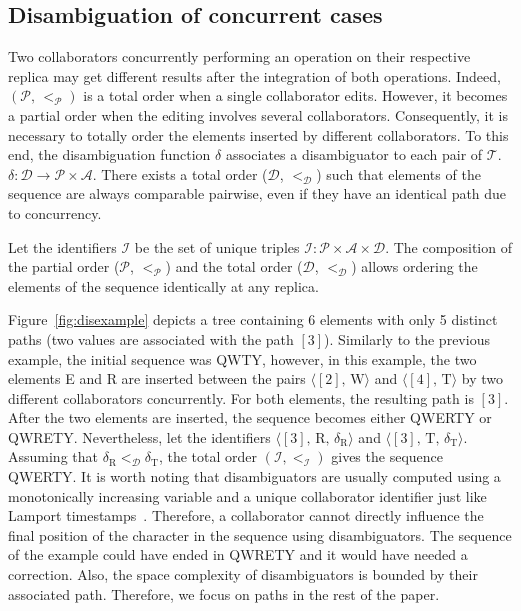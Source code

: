 \subsection{Disambiguation of concurrent cases}
\label{subsec:disambiguation}

Two collaborators concurrently performing an operation on their respective
replica may get different results after the integration of both
operations. Indeed, $(\mathcal{P},\,<_\mathcal{P})$ is a total order when a
single collaborator edits. However, it becomes a partial order when the editing
involves several collaborators. Consequently, it is necessary to totally order
the elements inserted by different collaborators. To this end, the
disambiguation function $\delta$ associates a disambiguator to each pair of
$\mathcal{T}$. $\delta: \mathcal{D} \rightarrow \mathcal{P}\times\mathcal{A}$.
There exists a total order ($\mathcal{D}$, $<_{\mathcal{D}}$) such that elements
of the sequence are always comparable pairwise, even if they have an identical
path due to concurrency. 

Let the identifiers $\mathcal{I}$ be the set of unique triples
$\mathcal{I}:\mathcal{P}\times \mathcal{A}\times \mathcal{D}$. The composition
of the partial order ($\mathcal{P}$, $<_{\mathcal{P}}$) and the total order
($\mathcal{D}$, $<_{\mathcal{D}}$) allows ordering the elements of the sequence
identically at any replica.

Figure~\ref{fig:disexample} depicts a tree containing 6 elements with only 5
distinct paths (two values are associated with the path $[3]$). Similarly to the
previous example, the initial sequence was QWTY, however, in this example, the
two elements E and R are inserted between the pairs
$\langle [2],\, \text{W}\rangle$ and $\langle [4],\, \text{T}\rangle$ by two
different collaborators concurrently. For both elements, the resulting path is
$[3]$. After the two elements are inserted, the sequence becomes either QWERTY
or QWRETY. Nevertheless, let the identifiers
$\langle [3],\, \text{R},\, \delta_\text{R}\rangle$ and
$\langle [3],\, \text{T},\, \delta_\text{T} \rangle$. Assuming that
$\delta_\text{R} <_\mathcal{D} \delta_\text{T}$, the total order
$(\mathcal{I}, <_\mathcal{I})$ gives the sequence QWERTY. It is worth noting
that disambiguators are usually computed using a monotonically increasing
variable and a unique collaborator identifier just like Lamport
timestamps~\cite{lamport1978time}. Therefore, a collaborator cannot directly
influence the final position of the character in the sequence using
disambiguators. The sequence of the example could have ended in QWRETY and it
would have needed a correction. Also, the space complexity of disambiguators is
bounded by their associated path. Therefore, we focus on paths in the rest of
the paper.

